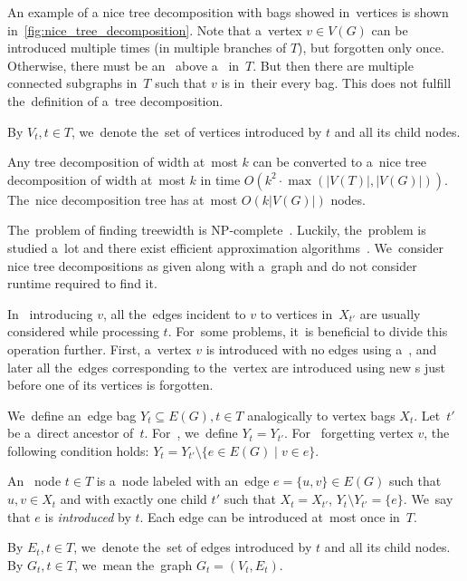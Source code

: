 An example of a nice tree decomposition with bags showed in~vertices
is shown in~\cref{fig:nice_tree_decomposition}.
%
Note that a~vertex \( v \in V(G) \) can be introduced multiple times
(in multiple branches of \( T \)),
but forgotten only once.
%
Otherwise, there must be an~\IntroduceVertexNode{} above a~\ForgetVertexNode{} in~\( T \).
But then there are multiple connected subgraphs in~\( T \)
such that \( v \) is in~their every bag.
This does not fulfill the~definition of a~tree decomposition.

By \( V_t, t \in T \), we~denote the~set of vertices introduced by \( t \)
and all its child nodes.
%
\begin{lemma}
	Any tree decomposition of width at~most \( k \) can be converted to
	a~nice tree decomposition of width at~most \( k \)
	in time \( O(k^2 \cdot \max(|V(T)|, |V(G)|)) \).
	The~nice decomposition tree has at~most \( O(k|V(G)|) \) nodes.
\end{lemma}

The~problem of finding treewidth is NP-complete~\cite{tree_width_np_complete}.
Luckily, the~problem is studied a~lot and
there exist efficient approximation algorithms~\cite{tree_width_approximation}.
We~consider nice tree decompositions as given along with a~graph
and do not consider runtime required to find it.

In~\IntroduceVertexNode{} introducing \( v \), all the~edges incident to \( v \)
to vertices in~\( X_{t'} \) are usually considered while processing \( t \).
%
For~some problems, it~is beneficial to divide this operation further.
First, a~vertex \( v \) is introduced with no edges using a~\IntroduceVertexNode{},
and later all the~edges corresponding to the~vertex are introduced using new \IntroduceEdgeNode{}s
just before one of its vertices is forgotten.

We~define an~edge bag \( Y_t \subseteq E(G), t \in T \) analogically to vertex bags \( X_t \).
%
Let~\( t' \) be a~direct ancestor of~\( t \).
For~\IntroduceVertexNode{}, we~define \( Y_t = Y_{t'} \).
For~\ForgetVertexNode{} forgetting vertex \( v \),
the following condition holds: \( Y_t = Y_{t'} \setminus \{ e \in E(G) \mid v \in e\} \).
%
\begin{definition}
	An~\IntroduceEdgeNode{} node \( t \in T \) is a~node
	labeled with an~edge \( e = \{u, v\} \in E(G) \)
	such that \( u, v \in X_t \) and with exactly one child \( t' \)
	such that \( X_t = X_{t'} \), \( Y_t \setminus Y_{t'} = \{e\} \).
	We~say that \( e \) is \emph{introduced} by \( t \).
	Each edge can be introduced at~most once in~\( T \).
\end{definition}
%
By \( E_t, t \in T \), we~denote the~set of edges introduced by \( t \)
and all its child nodes.
By \( G_t, t \in T \), we~mean the~graph \( G_t = (V_t, E_t) \).

